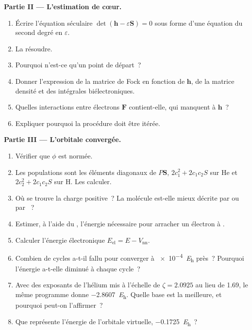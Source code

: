 \begin{problem}
\medskip\noindent\textbf{Partie II --- L'estimation de cœur.}
\begin{enumerate}[resume]
  \item Écrire l'équation séculaire $\det(\mathbf h - \varepsilon\mathbf S) = 0$
        sous forme d'une équation du second degré en $\varepsilon$.
  \item La résoudre.
  \item Pourquoi n'est-ce qu'un point de départ~?
  \item Donner l'expression de la matrice de Fock en fonction de $\mathbf h$,
        de la matrice densité et des intégrales biélectroniques.
  \item Quelles interactions entre électrons $\mathbf F$ contient-elle,
        qui manquent à $\mathbf h$~?
  \item Expliquer pourquoi la procédure doit être itérée.
\end{enumerate}

\medskip\noindent\textbf{Partie III --- L'orbitale convergée.}
\begin{enumerate}[resume]
  \item Vérifier que $\phi$ est normée.
  \item Les populations sont les éléments diagonaux de $P\mathbf S$, $2c_1^2 + 2c_1c_2S$
        sur He et $2c_2^2 + 2c_1c_2S$ sur H. Les calculer.
  \item Où se trouve la charge positive~? La molécule est-elle mieux
        décrite par  ou par ~?
  \item Estimer, à l'aide du , l'énergie nécessaire
        pour arracher un électron à .
  \item Calculer l'énergie électronique $E_{\mathrm{el}} = E - V_{\mathrm{nn}}$.
  \item Combien de cycles a-t-il fallu pour converger à
        \qty{e-4}{\hartree} près~? Pourquoi l'énergie a-t-elle diminué à
        chaque cycle~?
  \item Avec des exposants de l'hélium mis à l'échelle de $\zeta = 2.0925$
        au lieu de 1.69, le même programme donne \qty{-2.8607}{\hartree}.
        Quelle base est la meilleure, et pourquoi peut-on l'affirmer~?
  \item Que représente l'énergie de l'orbitale virtuelle, \qty{-0.1725}{\hartree}~?
\end{enumerate}


\end{problem}
